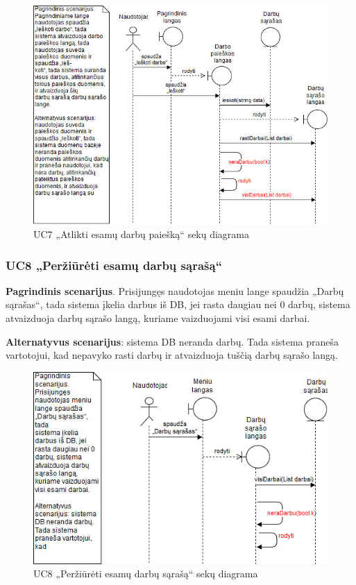 \documentclass{VUMIFPSbakalaurinis}
\begin{document}
\begin{figure}[H]
	\centering
	\includegraphics[scale=0.6]{img/Sequence/7sequence}
	\caption{UC7 „Atlikti esamų darbų paiešką“ sekų diagrama}
	\label{img:uc7seq}
\end{figure}

\subsubsection{UC8 „Peržiūrėti esamų darbų sąrašą“}
\textbf{Pagrindinis scenarijus}. Prisijungęs naudotojas meniu lange spaudžia „Darbų sąrašas“, tada sistema įkelia darbus iš DB, jei rasta daugiau nei 0 darbų, sistema atvaizduoja darbų sąrašo langą, kuriame vaizduojami visi esami darbai.
\par \textbf{Alternatyvus scenarijus}: sistema DB neranda darbų. Tada sistema praneša vartotojui, kad nepavyko rasti darbų ir atvaizduoja tuščią darbų sąrašo langą.

\begin{figure}[H]
	\centering
	\includegraphics[scale=0.6]{img/Sequence/8sequence}
	\caption{UC8 „Peržiūrėti esamų darbų sąrašą“ sekų diagrama}
	\label{img:uc8seq}
\end{figure}
\end{document}
